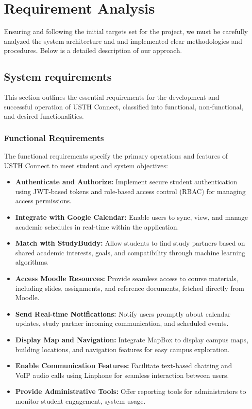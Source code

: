 \documentclass[12pt]{article}
\begin{document}
\pagebreak


\section{Requirement Analysis}
Ensuring and following the initial targets set for the project, we must be carefully analyzed the system
architecture and and implemented clear methodologies and procedures. Below is a detailed description of our approach.

\subsection{System requirements}
This section outlines the essential requirements for the development and successful operation of USTH Connect, classified into functional, non-functional, and desired functionalities.

\subsubsection{Functional Requirements}
The functional requirements specify the primary operations and features of USTH Connect to meet student and system objectives:  
\begin{itemize}  
    \item \textbf{Authenticate and Authorize:} Implement secure student authentication using JWT-based tokens and role-based access control (RBAC) for managing access permissions.  
    \item \textbf{Integrate with Google Calendar:} Enable users to sync, view, and manage academic schedules in real-time within the application.  
    \item \textbf{Match with StudyBuddy:} Allow students to find study partners based on shared academic interests, goals, and compatibility through machine learning algorithms.  
    \item \textbf{Access Moodle Resources:} Provide seamless access to course materials, including slides, assignments, and reference documents, fetched directly from Moodle.  
    \item \textbf{Send Real-time Notifications:} Notify users promptly about calendar updates, study partner incoming communication, and scheduled events.  
    \item \textbf{Display Map and Navigation:} Integrate MapBox to display campus maps, building locations, and navigation features for easy campus exploration.  
    \item \textbf{Enable Communication Features:} Facilitate text-based chatting and VoIP audio calls using Linphone for seamless interaction between users.  
    \item \textbf{Provide Administrative Tools:} Offer reporting tools for administrators to monitor student engagement, system usage.  
\end{itemize} 
\end{document}
